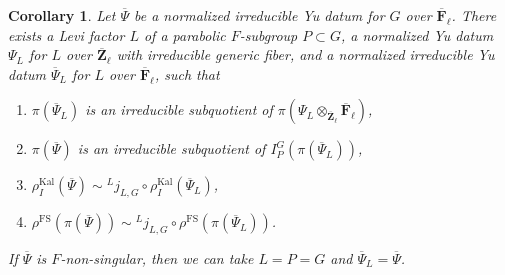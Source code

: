 \documentclass[reqno]{amsart}
\numberwithin{equation}{subsection}
\newcommand{\F}{\mathbf{F}}
\newcommand{\Z}{\mathbf{Z}}
\newcommand{\ol}[1]{\overline{#1}}
\newcommand{\ld}{{}^L}
\DeclareMathOperator{\FS}{FS}
\DeclareMathOperator{\Kal}{Kal}
\newtheorem{cor}[thm]{Corollary}
\theoremstyle{remark}
\numberwithin{equation}{subsection}
\numberwithin{figure}{subsection}
\begin{document}
\begin{cor}\label{cor:lift-tame-reps-to-char-0}
Let $\ol\Psi$ be a normalized irreducible Yu datum for $G$ over $\ol\F_\ell$. There exists a Levi factor $L$ of a parabolic $F$-subgroup $P \subset G$, a normalized Yu datum $\Psi_L$ for $L$ over $\ol\Z_\ell$ with irreducible generic fiber, and a normalized irreducible Yu datum $\ol\Psi_L$ for $L$ over $\ol\F_\ell$, such that
\begin{enumerate}
    \item $\pi(\ol\Psi_L)$ is an irreducible subquotient of $\pi(\Psi_L \otimes_{\ol\Z_\ell}\ol\F_\ell)$,
    \item $\pi(\ol\Psi)$ is an irreducible subquotient of $I_P^G(\pi(\ol\Psi_L))$,
    \item $\rho_I^{\Kal}(\ol\Psi) \sim \ld j_{L,G} \circ \rho_I^{\Kal}(\ol\Psi_L)$,
    \item $\rho^{\FS}(\pi(\ol\Psi)) \sim \ld j_{L,G} \circ \rho^{\FS}(\pi(\ol\Psi_L))$.
\end{enumerate} 
If $\ol\Psi$ is $F$-non-singular, then we can take $L=P=G$ and $\ol\Psi_L = \ol\Psi$.
\end{cor}
\end{document}
